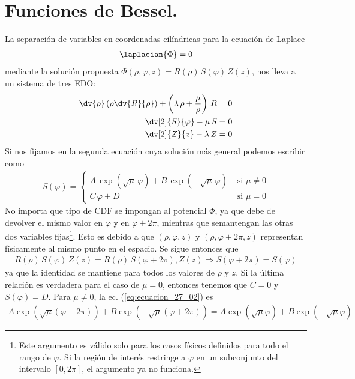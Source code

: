 \section{Funciones de Bessel.}
La separación de variables en coordenadas cilíndricas para la ecuación de Laplace
\begin{align*}
\laplacian{\Phi} = 0
\end{align*}
mediante la solución propuesta $\Phi (\rho, \varphi, z) = R(\rho) \, S(\varphi) \, Z(z)$, nos lleva a un sistema de tres EDO:
\begin{align}
\begin{aligned}
\dv{\rho} \left( \rho \dv{R}{\rho} \right) + \left( \lambda \, \rho + \dfrac{\mu}{\rho} \right) \, R &= 0 \\
\dv[2]{S}{\varphi} - \mu \, S &= 0 \\
\dv[2]{Z}{z} - \lambda \, Z &= 0
\end{aligned}
\label{eq:ecuacion_27_01}
\end{align}
Si nos fijamos en la segunda ecuación cuya solución más general podemos escribir como
\begin{align}
S (\varphi) = \begin{cases}
A \, \exp(\sqrt{\mu} \, \varphi) + B \, \exp(-\sqrt{\mu} \, \varphi) & \mbox{ si } \mu \neq 0 \\
C \,\varphi + D & \mbox { si } \mu = 0
\end{cases}
\label{eq:ecuacion_27_02}
\end{align}
No importa que tipo de CDF se impongan al potencial $\Phi$, ya que debe de devolver el mismo valor en $\varphi$ y en $\varphi + 2 \pi$, mientras que semantengan las otras dos variables fijas\footnote{Este argumento es válido solo para los casos físicos definidos para todo el rango de $\varphi$. Si la región de interés restringe a $\varphi$ en un subconjunto del intervalo $[0, 2 \pi]$, el argumento ya no funciona.}. Esto es debido a que $(\rho, \varphi, z)$ y $(\rho, \varphi + 2 \pi, z)$ representan físicamente al mismo punto en el espacio. Se sigue entonces que
\begin{align*}
R(\rho) \, S(\varphi) \, Z(z) = R(\rho)  \, S(\varphi + 2 \pi) , Z(z) \Longrightarrow S(\varphi + 2 \pi) = S (\varphi)
\end{align*}
ya que la identidad se mantiene para todos los valores de $\rho$ y $z$. Si la última relación es verdadera para el caso de $\mu = 0$, entonces tenemos que $C = 0$ y $S(\varphi) = D$. Para $\mu \neq 0$, la ec. (\ref{eq:ecuacion_27_02}) es
\begin{align*}
A \exp(\sqrt{\mu}(\varphi + 2 \pi)) + B \exp(- \sqrt{\mu}(\varphi + 2 \pi)) = A \exp(\sqrt{\mu} \varphi) + B \exp(-\sqrt{\mu} \varphi)
\end{align*}
